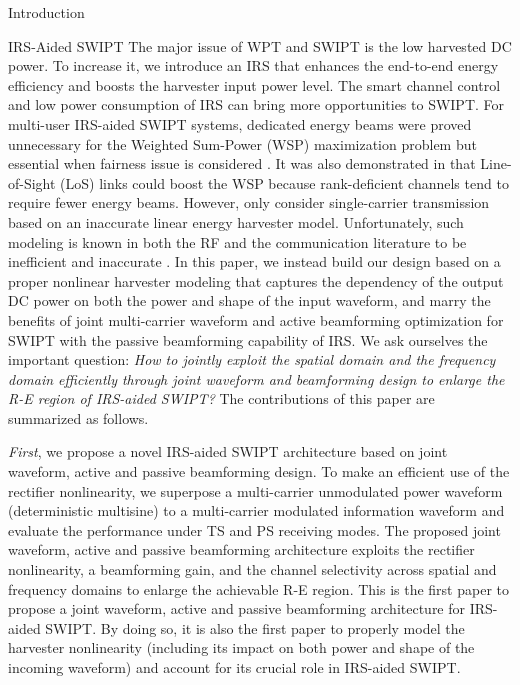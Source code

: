 \documentclass[journal]{IEEEtran}
\begin{document}
\begin{section}{Introduction}
		\begin{subsection}{IRS-Aided SWIPT}
			The major issue of WPT and SWIPT is the low harvested DC power. To increase it, we introduce an IRS that enhances the end-to-end energy efficiency and boosts the harvester input power level. The smart channel control and low power consumption of IRS can bring more opportunities to SWIPT. For multi-user IRS-aided SWIPT systems, dedicated energy beams were proved unnecessary for the Weighted Sum-Power (WSP) maximization problem \cite{Wu2020b} but essential when fairness issue is considered \cite{Tang2019}. It was also demonstrated in \cite{Wu2020a} that Line-of-Sight (LoS) links could boost the WSP because rank-deficient channels tend to require fewer energy beams. However, \cite{Wu2020b,Tang2019,Wu2020a} only consider single-carrier transmission based on an inaccurate linear energy harvester model. Unfortunately, such modeling is known in both the RF and the communication literature to be inefficient and inaccurate \cite{Clerckx2019,Trotter2009,Clerckx2018,Clerckx2016a,Kim2019,Kim2020a,Kim2021,Clerckx2017,Kim2017,Clerckx2018b,Varasteh2020,Varasteh2019d,Varasteh2020a}. In this paper, we instead build our design based on a proper nonlinear harvester modeling that captures the dependency of the output DC power on both the power and shape of the input waveform, and marry the benefits of joint multi-carrier waveform and active beamforming optimization for SWIPT with the passive beamforming capability of IRS. We ask ourselves the important question: \emph{How to jointly exploit the spatial domain and the frequency domain efficiently through joint waveform and beamforming design to enlarge the R-E region of IRS-aided SWIPT?} The contributions of this paper are summarized as follows.

			\emph{First}, we propose a novel IRS-aided SWIPT architecture based on joint waveform, active and passive beamforming design. To make an efficient use of the rectifier nonlinearity, we superpose a multi-carrier unmodulated power waveform (deterministic multisine) to a multi-carrier modulated information waveform and evaluate the performance under TS and PS receiving modes. The proposed joint waveform, active and passive beamforming architecture exploits the rectifier nonlinearity, a beamforming gain, and the channel selectivity across spatial and frequency domains to enlarge the achievable R-E region. This is the first paper to propose a joint waveform, active and passive beamforming architecture for IRS-aided SWIPT. By doing so, it is also the first paper to properly model the harvester nonlinearity (including its impact on both power and shape of the incoming waveform) and account for its crucial role in IRS-aided SWIPT.


\end{subsection}
\end{section}
\end{document}
